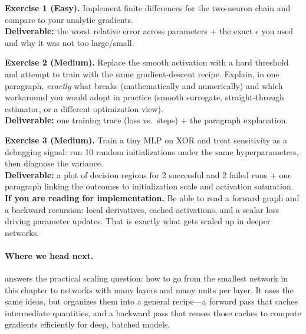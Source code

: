 \begin{tcolorbox}[summarybox, title={Exercises}]
\textbf{Exercise 1 (Easy).} Implement finite differences for the two\hyp{}neuron chain and compare to your analytic gradients. \\
\textbf{Deliverable:} the worst relative error across parameters + the exact \(\epsilon\) you used and why it was not too large/small.

\smallskip
\textbf{Exercise 2 (Medium).} Replace the smooth activation with a hard threshold and attempt to train with the same gradient-descent recipe. Explain, in one paragraph, \emph{exactly} what breaks (mathematically and numerically) and which workaround you would adopt in practice (smooth surrogate, straight-through estimator, or a different optimization view). \\
\textbf{Deliverable:} one training trace (loss vs.\ steps) + the paragraph explanation.

\smallskip
\textbf{Exercise 3 (Medium).} Train a tiny MLP on XOR and treat sensitivity as a debugging signal: run 10 random initializations under the same hyperparameters, then diagnose the variance. \\
\textbf{Deliverable:} a plot of decision regions for 2 successful and 2 failed runs + one paragraph linking the outcomes to initialization scale and activation saturation.
\medskip
\noindent\textbf{If you are reading for implementation.} Be able to read a forward graph and a backward recursion: local derivatives, cached activations, and a scalar loss driving parameter updates. That is exactly what gets scaled up in deeper networks.
\end{tcolorbox}

\medskip
\paragraph{Where we head next.}
 answers the practical scaling question: how to go from the smallest network in this chapter to networks with many layers and many units per layer. It uses the same ideas, but organizes them into a general recipe---a forward pass that caches intermediate quantities, and a backward pass that reuses those caches to compute gradients efficiently for deep, batched models.

